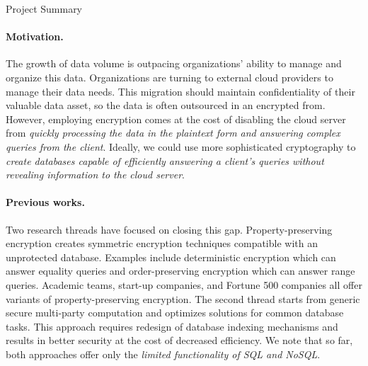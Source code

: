 \documentclass[11pt]{article}
\begin{document}
\begin{center}
\LARGE
Project Summary 
\end{center}

\vspace{-1.5em}
\noindent \hrulefill



\paragraph{Motivation.}
%
The growth of data volume is outpacing organizations' ability to manage and
organize this data. Organizations are turning to external cloud providers
to manage their data needs.  
%
This migration should maintain confidentiality of their
valuable data asset, so the data is often outsourced in an encrypted from. 
%
However, employing encryption comes at the cost of disabling the cloud server
from {\em quickly processing the data in the plaintext form and answering
complex queries from the client}. 
%
Ideally, we could use more sophisticated cryptography to {\em create databases
capable of efficiently answering a client's queries without revealing
information to the cloud server}.  

\paragraph{Previous works.}
Two research threads have focused on closing this gap.
Property-preserving encryption creates symmetric encryption techniques
compatible with an unprotected database. Examples include deterministic
encryption which can answer equality queries and order-preserving encryption
which can answer range queries. Academic teams, start-up companies, and Fortune
500 companies all offer variants of property-preserving encryption.
%
The second thread starts from generic secure multi-party computation and
optimizes solutions for common database tasks. This approach requires redesign
of database indexing mechanisms and results in better security at the cost of
decreased efficiency. 
%
We note that so far, both approaches offer only the {\em limited functionality
of SQL and NoSQL}. 
\end{document}
